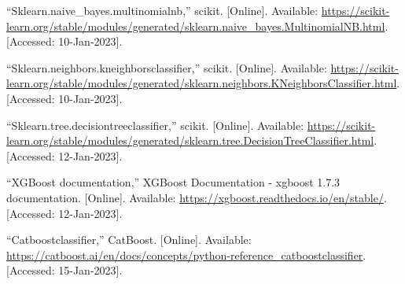 \documentclass{IEEEtran}
\begin{document}
\begin{thebibliography}{00}
     “Sklearn.naive\_bayes.multinomialnb,” scikit. [Online]. Available: \url{https://scikit-learn.org/stable/modules/generated/sklearn.naive_bayes.MultinomialNB.html}. [Accessed: 10-Jan-2023]. 

     “Sklearn.neighbors.kneighborsclassifier,” scikit. [Online]. Available: \url{https://scikit-learn.org/stable/modules/generated/sklearn.neighbors.KNeighborsClassifier.html}. [Accessed: 10-Jan-2023]. 

     “Sklearn.tree.decisiontreeclassifier,” scikit. [Online]. Available: \url{https://scikit-learn.org/stable/modules/generated/sklearn.tree.DecisionTreeClassifier.html}. [Accessed: 12-Jan-2023].

     “XGBoost documentation,” XGBoost Documentation - xgboost 1.7.3 documentation. [Online]. Available: \url{https://xgboost.readthedocs.io/en/stable/}. [Accessed: 12-Jan-2023].

     “Catboostclassifier,” CatBoost. [Online]. Available: \url{https://catboost.ai/en/docs/concepts/python-reference_catboostclassifier}. [Accessed: 15-Jan-2023]. 
\end{thebibliography}
\end{document}
